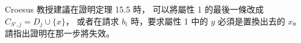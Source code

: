 \startPROBLEM
Croesus 教授建議在證明定理 15.5 時，
可以將屬性 1 的最後一條改成 $C_{S',j}=D_j\cup \{x\}$，
或者在請求 $b_i$ 時，要求屬性 1 中的 $y$ 必須是置換出去的 $x$。
請指出證明在那一步將失效。
\stopPROBLEM
